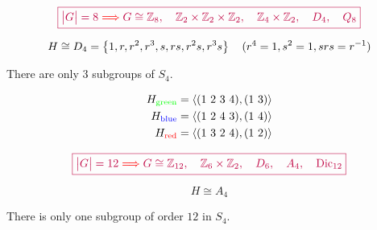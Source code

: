 \begin{frame}{}
  \[
	\textcolor{purple}{\boxed{\big\lvert G \big\rvert = 8 \textcolor{red}{\implies} G \cong \mathbb{Z}_{8},\quad \mathbb{Z}_2 \times \mathbb{Z}_2 \times \mathbb{Z}_2,\quad \mathbb{Z}_4 \times \mathbb{Z}_2,\quad D_4,\quad Q_8}}
  \]

  \[
    H \cong D_4 = \left\{ 1, r, r^2, r^3, s, rs, r^2s, r^3s \right\} \quad (r^4 = 1, s^2 = 1, srs = r^{-1})
  \]

  \pause

  \pause
  \begin{theorem}
	There are only $3$ subgroups  of $S_4$.
  \end{theorem}
\end{frame}

\begin{frame}{}

  \pause
  \vspace{-1.00cm}
  \begin{align*}
	H_{\rm \textcolor{green}{green}} &= \langle (1\ 2\ 3\ 4), (1\ 3) \rangle \\
	H_{\rm \textcolor{blue}{blue}}   &= \langle (1\ 2\ 4\ 3), (1\ 4) \rangle \\
	H_{\rm \textcolor{red}{red}}     &= \langle (1\ 3\ 2\ 4), (1\ 2) \rangle 
  \end{align*}
\end{frame}

\begin{frame}{}
  \[
	\textcolor{purple}{\boxed{\big\lvert G \big\rvert = 12 \textcolor{red}{\implies} G \cong \mathbb{Z}_{12},\quad \mathbb{Z}_6 \times \mathbb{Z}_2,\quad D_6,\quad A_4,\quad \text{Dic}_{12}}}
  \]

  \pause
  \[
    H \cong A_4
  \]

  \pause
  \begin{theorem}
    There is only one subgroup of order $12$ in $S_4$.
  \end{theorem}
\end{frame}

